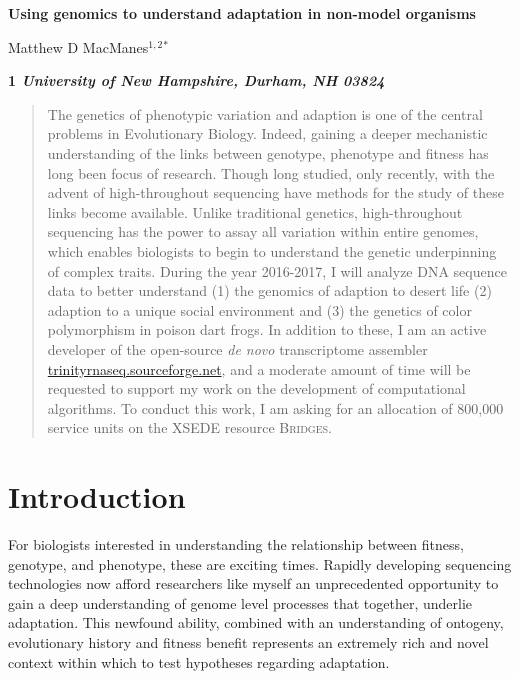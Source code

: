 \documentclass[10.5pt]{article}
\begin{document}
\begin{flushleft}
{\large
\textbf{Using genomics to understand adaptation in non-model organisms }
}

\vspace{8mm}

\noindent
Matthew D MacManes$^{1,2}$$^\ast$\\
\vspace{4mm}


\bf{1} \textnormal{\em{University of New Hampshire, Durham, NH 03824}}  \\


\end{flushleft}
\vspace{8mm}


\begin{abstract}
The genetics of phenotypic variation and adaption is one of the central problems in Evolutionary Biology. Indeed, gaining a deeper mechanistic understanding of the links between genotype, phenotype and fitness has long been focus of research.  Though long studied, only recently, with the advent of high-throughout sequencing have methods for the study of these links become available. Unlike traditional genetics, high-throughout sequencing has the power to assay all variation within entire genomes, which enables biologists to begin to understand the genetic underpinning of complex traits. During the year 2016-2017, I will analyze DNA sequence data to better understand (1) the genomics of adaption to desert life (2) adaption to a unique social environment and (3) the genetics of color polymorphism in poison dart frogs.
In addition to these, I am an active developer of the open-source \textit{de novo} transcriptome assembler \url{trinityrnaseq.sourceforge.net}, and a moderate amount of time will be requested to support my work on the development of computational algorithms.  To conduct this work, I am asking for an allocation of 800,000 service units on the XSEDE resource \textsc{Bridges}.  


\end{abstract}

\doublespacing
\linenumbers

\vspace{12mm}

\section*{Introduction}
For biologists interested in understanding the relationship between fitness, genotype, and phenotype, these are exciting times. Rapidly developing sequencing technologies now afford researchers like myself an unprecedented opportunity to gain a deep understanding of genome level processes that together, underlie adaptation.  This newfound ability, combined with an understanding of ontogeny, evolutionary history and fitness benefit represents an extremely rich and novel context within which to test hypotheses regarding adaptation.  \\
\end{document}
